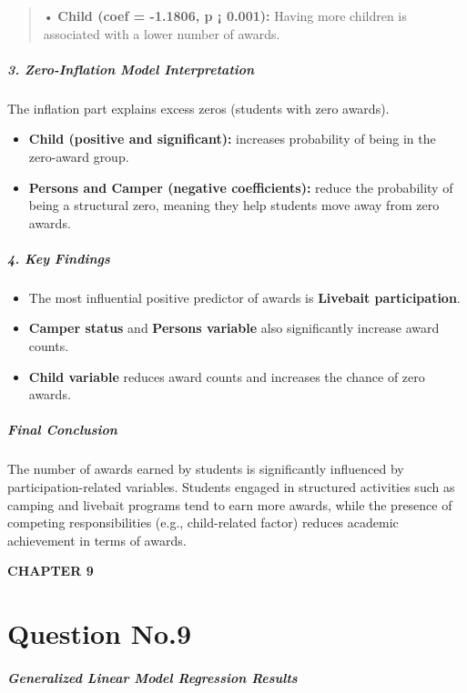 \begin{quote}
• \textbf{Child (coef = -1.1806, p ¡ 0.001):} Having more children is
associated with a lower number of awards.
\end{quote}

\subparagraph{3. Zero-Inflation Model
Interpretation}\label{zero-inflation-model-interpretation}

The inflation part explains excess zeros (students with zero awards).

\begin{itemize}
\item
  \textbf{Child (positive and significant):} increases probability of
  being in the zero-award group.
\item
  \textbf{Persons and Camper (negative coefficients):} reduce the
  probability of being a structural zero, meaning they help students
  move away from zero awards.
\end{itemize}

\subparagraph{4. Key Findings}\label{key-findings}

\begin{itemize}
\item
  The most influential positive predictor of awards is \textbf{Livebait
  participation}.
\item
  \textbf{Camper status} and \textbf{Persons variable} also
  significantly increase award counts.
\item
  \textbf{Child variable} reduces award counts and increases the chance
  of zero awards.
\end{itemize}

\subparagraph{Final Conclusion}\label{final-conclusion-1}

The number of awards earned by students is significantly influenced by
participation-related variables. Students engaged in structured
activities such as camping and livebait programs tend to earn more
awards, while the presence of competing responsibilities (e.g.,
child-related factor) reduces academic achievement in terms of awards.

\textbf{CHAPTER 9}

\section{Question No.9}\label{question-no.9}

\subparagraph{Generalized Linear Model Regression
Results}\label{generalized-linear-model-regression-results-3}

